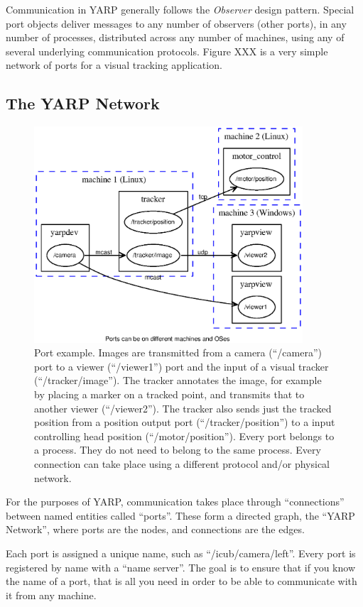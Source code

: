 Communication in YARP generally follows the {\it Observer} design
pattern. Special port objects deliver messages to any number of
observers (other ports), in any number of processes, distributed
across any number of machines, using any of several underlying
communication protocols. Figure XXX is a very simple network of ports
for a visual tracking application.






\subsection{The YARP Network}


\begin{figure}[t]
\centerline{
\includegraphics[width=10cm]{fig-ports}
}
\caption{
%
Port example.
Images are transmitted from a camera (``/camera'') port to a viewer
(``/viewer1'') port and the input of a visual tracker
(``/tracker/image''). The tracker annotates the image, for example by
placing a marker on a tracked point, and transmits that to another
viewer (``/viewer2''). The tracker also sends just the tracked position
from a position output port (``/tracker/position'') to a input
controlling head position (``/motor/position''). Every port belongs to a
process. They do not need to belong to the same process. Every
connection can take place using a different protocol and/or physical
network.
%
}
\end{figure}

For the purposes of YARP, communication takes place through
``connections'' between named entities called ``ports''. These form a
directed graph, the ``YARP Network'', where ports are the nodes, and
connections are the edges.

Each port is assigned a unique name, such as
``/icub/camera/left''. Every port is registered by name with a ``name
server''. The goal is to ensure that if you know the name of a port,
that is all you need in order to be able to communicate with it from
any machine.

